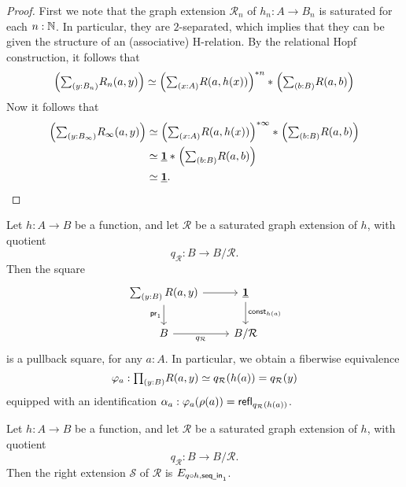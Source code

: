 \begin{proof}
First we note that the graph extension $\mathcal{R}_n$ of $h_n:A\to B_n$ is saturated for each $n:\mathbb{N}$. In particular, they are $2$-separated, which implies that they can be given the structure of an (associative) H-relation. By the relational Hopf construction, it follows that 
\begin{equation*}
\Big(\sm{y:B_{n}}R_{n}(a,y)\Big)\eqvsym \join{\Big(\sm{x:A}R(a,h(x))\Big)^{\ast n}}{\Big(\sm{b:B}R(a,b)\Big)}
\end{equation*}
Now it follows that 
\begin{align*}
\Big(\sm{y:B_{\infty}}R_{\infty}(a,y)\Big) & \eqvsym \join{\Big(\sm{x:A}R(a,h(x))\Big)^{\ast \infty}}{\Big(\sm{b:B}R(a,b)\Big)} \\
& \eqvsym \join{\unit}{\Big(\sm{b:B}R(a,b)\Big)} \\
& \eqvsym \unit.\qedhere
\end{align*}
\end{proof}

\begin{cor}
Let $h:A\to B$ be a function, and let $\mathcal{R}$ be a saturated graph extension of $h$, with quotient
\begin{equation*}
q_{\mathcal{R}}:B\to B/\mathcal{R}.
\end{equation*}
Then the square
\begin{equation*}
\begin{tikzcd}
\sm{y:B}R(a,y) \arrow[r] \arrow[d,swap,"\proj 1"] & \unit \arrow[d,"\mathsf{const}_{h(a)}"] \\
B \arrow[r,swap,"q_{\mathcal{R}}"] & B/\mathcal{R}
\end{tikzcd}
\end{equation*}
is a pullback square, for any $a:A$. In particular, we obtain a fiberwise equivalence
\begin{equation*}
\varphi_{a} : \prd{y:B} R(a,y) \eqvsym q_{\mathcal{R}}(h(a))=q_{\mathcal{R}}(y)
\end{equation*}
equipped with an identification $\alpha_a:\varphi_a(\rho(a))=\mathsf{refl}_{q_{\mathcal{R}}(h(a))}$.
\end{cor}

\begin{prp}
Let $h:A\to B$ be a function, and let $\mathcal{R}$ be a saturated graph extension of $h$, with quotient
\begin{equation*}
q_{\mathcal{R}}:B\to B/\mathcal{R}.
\end{equation*}
Then the right extension $\mathcal{S}$ of $\mathcal{R}$ is $E_{q\circ h,\mathsf{seq\underline{\ }{}in}_1}$. 
\end{prp}

